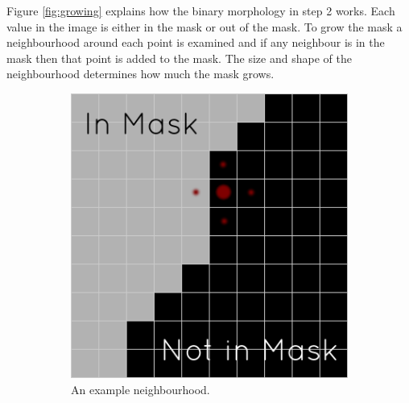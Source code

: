 Figure \ref{fig:growing} explains how the binary morphology in step 2 works. Each value in the image is either in the mask or out of the mask. To grow the mask a neighbourhood around each point is examined and if any neighbour is in the mask then that point is added to the mask. The size and shape of the neighbourhood determines how much the mask grows.

\begin{figure}[H]
  \centering
  \begin{subfigure}[b]{0.5\textwidth}
    \includegraphics[width=\textwidth]{images/erosion/growing_1.png}
    \caption{An example neighbourhood.}\label{fig:growing_1}
  \end{subfigure}%
  ~ %
  \begin{subfigure}[b]{0.5\textwidth}

\end{subfigure}
\end{figure}
